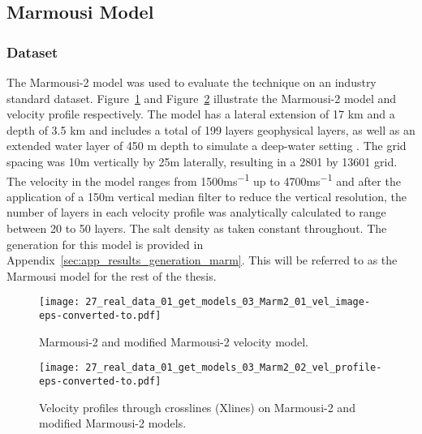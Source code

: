 \subsection{Marmousi Model}\label{sec:results_Numerical_experiment}
\subsubsection{Dataset}\label{sec:results_marmousi_dataset}
The Marmousi-2 model \citep{Martin2002} was used to evaluate the technique on an industry standard dataset. Figure~\ref{fig:marm_modified} and Figure~\ref{fig:marm_modified_velocity} illustrate the Marmousi-2 model and velocity profile respectively. The model has a lateral extension of 17 km and a depth of 3.5 km and includes a total of 199 layers geophysical layers, as well as an extended water layer of 450 m depth to simulate a deep-water setting \citep{Martin2002}. The grid spacing was 10m vertically by 25m laterally, resulting in a 2801 by 13601 grid. The velocity in the model ranges from 1500\si{ms^{-1}} up to 4700\si{ms^{-1}} and after the application of a 150m vertical median filter to reduce the vertical resolution, the number of layers in each velocity profile was analytically calculated to range between 20 to 50 layers. The salt density as taken constant throughout. The generation for this model is provided in Appendix~\ref{sec:app_results_generation_marm}. This will be referred to as the Marmousi model for the rest of the thesis.

\clearpage
\begin{figure}[ht!]
    \centering
    \texttt{[image: 27\_real\_data\_01\_get\_models\_03\_Marm2\_01\_vel\_image-eps-converted-to.pdf]}
    \caption[Marmousi-2 and modified Marmousi-2 velocity model.]{Marmousi-2 and modified Marmousi-2 velocity model.}
    \label{fig:marm_modified}
\end{figure}

\begin{figure}[ht!]
    \centering
    \texttt{[image: 27\_real\_data\_01\_get\_models\_03\_Marm2\_02\_vel\_profile-eps-converted-to.pdf]}
    \caption[Velocity profiles through crosslines on Marmousi-2 and modified Marmousi-2.]{Velocity profiles through crosslines (Xlines) on Marmousi-2 and modified Marmousi-2 models.}
    \label{fig:marm_modified_velocity}
\end{figure}

